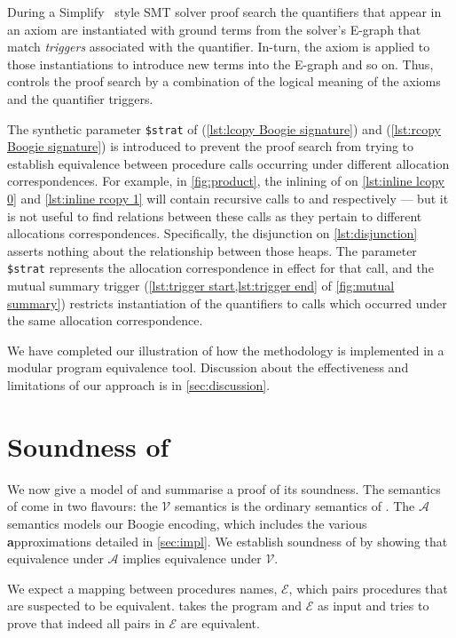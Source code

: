 \documentclass[runningheads,a4paper]{llncs}
\newcommand*{\equivmap}{\mathcal{E}}
\newcommand*\Asemantics{\mathcal{A}}
\newcommand*\asemantics{$\Asemantics$ semantics}
\newcommand*\Vsemantics{\mathcal{V}}
\newcommand*\vsemantics{$\Vsemantics$ semantics}
\begin{document}
During a Simplify~\cite{Detlefs2005} style SMT solver proof search the quantifiers that appear in an axiom are instantiated with ground terms from the solver's E-graph that match \emph{triggers} associated with the quantifier. In-turn, the axiom is applied to those instantiations to introduce new terms into the E-graph and so on. Thus, \tool{} controls the proof search by a combination of the logical meaning of the axioms and the quantifier triggers.

The synthetic parameter \texttt{\$strat} of \copylr{} (\cref{lst:lcopy Boogie signature}) and \copyrl{} (\cref{lst:rcopy Boogie signature})  is introduced to prevent the proof search from trying to establish equivalence between procedure calls occurring under different allocation correspondences. For example, in \cref{fig:product}, the inlining of \copylr{} on \cref{lst:inline lcopy 0} and \cref{lst:inline rcopy 1} will contain recursive calls to \copylr{} and \copyrl{} respectively --- but it is not useful to find relations between these calls as they pertain to different allocations correspondences. Specifically, the disjunction on \cref{lst:disjunction} asserts nothing about the relationship between those heaps. The parameter \texttt{\$strat} represents the allocation correspondence in effect for that call, and the mutual summary trigger (\cref{lst:trigger start,lst:trigger end} of \cref{fig:mutual summary}) restricts instantiation of the quantifiers to calls which occurred under the same allocation correspondence.

We have completed our illustration of how the \metho{} methodology is implemented in a modular program equivalence tool. Discussion about the effectiveness and limitations of our approach is in \cref{sec:discussion}.

\section{Soundness of \metho{}}\label{sec:soundness}

We now give a model of \metho{} and summarise a proof of its soundness. The semantics of \lang{} come in two flavours: the \vsemantics{} is the ordinary semantics of \lang{}. The \asemantics{} models our Boogie encoding, which includes the various \textbf{a}pproximations detailed in \cref{sec:impl}. We establish soundness of \metho{} by showing that equivalence under $\Asemantics$ implies equivalence under $\Vsemantics$.

We expect a mapping between procedures names, $\equivmap$, which pairs procedures that are suspected to be equivalent. \metho{} takes the program and $\equivmap$ as input and tries to prove that indeed all pairs in $\equivmap$ are equivalent.
\end{document}

